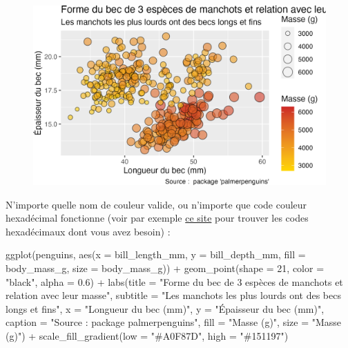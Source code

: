 \documentclass[
  letterpaper,
  DIV=11,
  numbers=noendperiod]{scrreprt}
\newenvironment{Shaded}{\begin{snugshade}}{\end{snugshade}}
\newcommand{\AttributeTok}[1]{\textcolor[rgb]{0.40,0.45,0.13}{#1}}
\newcommand{\DecValTok}[1]{\textcolor[rgb]{0.68,0.00,0.00}{#1}}
\newcommand{\FloatTok}[1]{\textcolor[rgb]{0.68,0.00,0.00}{#1}}
\newcommand{\FunctionTok}[1]{\textcolor[rgb]{0.28,0.35,0.67}{#1}}
\newcommand{\NormalTok}[1]{\textcolor[rgb]{0.00,0.23,0.31}{#1}}
\newcommand{\SpecialCharTok}[1]{\textcolor[rgb]{0.37,0.37,0.37}{#1}}
\newcommand{\StringTok}[1]{\textcolor[rgb]{0.13,0.47,0.30}{#1}}
\begin{document}
\begin{figure}[H]

{\centering \includegraphics{./03-visualization_files/figure-pdf/unnamed-chunk-95-1.png}

}

\end{figure}

N'importe quelle nom de couleur valide, ou n'importe que code couleur
hexadécimal fonctionne (voir par exemple \href{}{ce site} pour trouver
les codes hexadécimaux dont vous avez besoin) :

\begin{Shaded}
\begin{Highlighting}[]
\FunctionTok{ggplot}\NormalTok{(penguins, }\FunctionTok{aes}\NormalTok{(}\AttributeTok{x =}\NormalTok{ bill\_length\_mm, }\AttributeTok{y =}\NormalTok{ bill\_depth\_mm,}
                     \AttributeTok{fill =}\NormalTok{ body\_mass\_g, }\AttributeTok{size =}\NormalTok{ body\_mass\_g)) }\SpecialCharTok{+}
  \FunctionTok{geom\_point}\NormalTok{(}\AttributeTok{shape =} \DecValTok{21}\NormalTok{, }\AttributeTok{color =} \StringTok{"black"}\NormalTok{, }\AttributeTok{alpha =} \FloatTok{0.6}\NormalTok{) }\SpecialCharTok{+}
  \FunctionTok{labs}\NormalTok{(}\AttributeTok{title =} \StringTok{"Forme du bec de 3 espèces de manchots et relation avec leur masse"}\NormalTok{,}
       \AttributeTok{subtitle =} \StringTok{"Les manchots les plus lourds ont des becs longs et fins"}\NormalTok{,}
       \AttributeTok{x =} \StringTok{"Longueur du bec (mm)"}\NormalTok{,}
       \AttributeTok{y =} \StringTok{"Épaisseur du bec (mm)"}\NormalTok{,}
       \AttributeTok{caption =} \StringTok{"Source :  package \textquotesingle{}palmerpenguins\textquotesingle{}"}\NormalTok{,}
       \AttributeTok{fill =} \StringTok{"Masse (g)"}\NormalTok{,}
       \AttributeTok{size =} \StringTok{"Masse (g)"}\NormalTok{) }\SpecialCharTok{+}
  \FunctionTok{scale\_fill\_gradient}\NormalTok{(}\AttributeTok{low =} \StringTok{"\#A0F87D"}\NormalTok{, }\AttributeTok{high =} \StringTok{"\#151197"}\NormalTok{)}
\end{Highlighting}
\end{Shaded}
\end{document}

